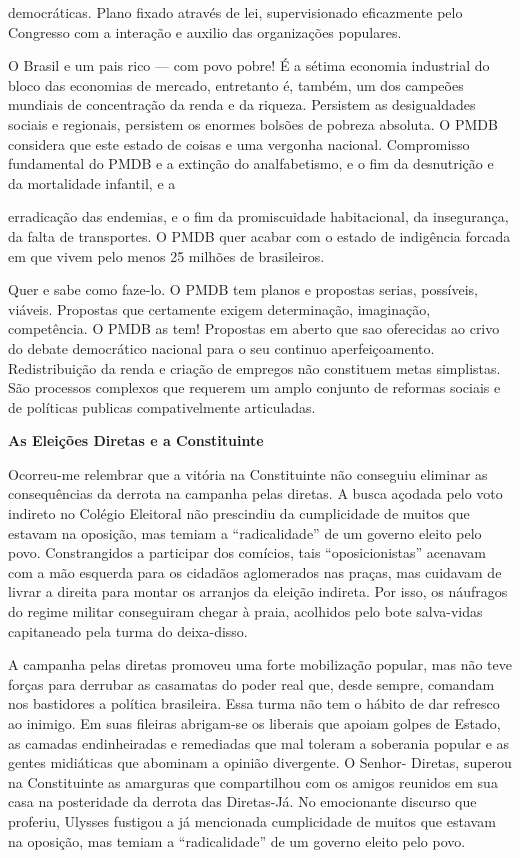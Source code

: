 democráticas. Plano fixado através de lei, supervisionado eficazmente
pelo Congresso com a interação e auxilio das organizações populares.

O Brasil e um pais rico --- com povo pobre! É a sétima economia
industrial do bloco das economias de mercado, entretanto é, também, um
dos campeões mundiais de concentração da renda e da riqueza. Persistem
as desigualdades sociais e regionais, persistem os enormes bolsões de
pobreza absoluta. O PMDB considera que este estado de coisas e uma
vergonha nacional. Compromisso fundamental do PMDB e a extinção do
analfabetismo, e o fim da desnutrição e da mortalidade infantil, e a

erradicação das endemias, e o fim da promiscuidade habitacional, da
insegurança, da falta de transportes. O PMDB quer acabar com o estado de
indigência forcada em que vivem pelo menos 25 milhões de brasileiros.

Quer e sabe como faze-lo. O PMDB tem planos e propostas serias,
possíveis, viáveis. Propostas que certamente exigem determinação,
imaginação, competência. O PMDB as tem! Propostas em aberto que sao
oferecidas ao crivo do debate democrático nacional para o seu continuo
aperfeiçoamento. Redistribuição da renda e criação de empregos não
constituem metas simplistas. São processos complexos que requerem um
amplo conjunto de reformas sociais e de políticas publicas
compativelmente articuladas.

\textbf{As Eleições Diretas e a Constituinte}

Ocorreu-me relembrar que a vitória na Constituinte não conseguiu
eliminar as consequências da derrota na campanha pelas diretas. A busca
açodada pelo voto indireto no Colégio Eleitoral não prescindiu da
cumplicidade de muitos que estavam na oposição, mas temiam a
``radicalidade'' de um governo eleito pelo povo. Constrangidos a
participar dos comícios, tais ``oposicionistas'' acenavam com a mão
esquerda para os cidadãos aglomerados nas praças, mas cuidavam de livrar
a direita para montar os arranjos da eleição indireta. Por isso, os
náufragos do regime militar conseguiram chegar à praia, acolhidos pelo
bote salva-vidas capitaneado pela turma do deixa-disso.

A campanha pelas diretas promoveu uma forte mobilização popular, mas não
teve forças para derrubar as casamatas do poder real que, desde sempre,
comandam nos bastidores a política brasileira. Essa turma não tem o
hábito de dar refresco ao inimigo. Em suas fileiras abrigam-se os
liberais que apoiam golpes de Estado, as camadas endinheiradas e
remediadas que mal toleram a soberania popular e as gentes midiáticas
que abominam a opinião divergente. O Senhor- Diretas, superou na
Constituinte as amarguras que compartilhou com os amigos reunidos em sua
casa na posteridade da derrota das Diretas-Já. No emocionante discurso
que proferiu, Ulysses fustigou a já mencionada cumplicidade de muitos
que estavam na oposição, mas temiam a ``radicalidade'' de um governo
eleito pelo povo.

